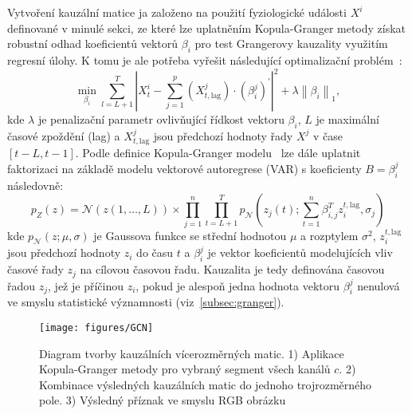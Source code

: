 Vytvoření kauzální matice ja založeno na použití fyziologické události $X^i$
definované v minulé sekci, ze které lze uplatněním Kopula-Granger metody získat
robustní odhad koeficientů vektorů $\beta_i$ pro test Grangerovy kauzality
využitím regresní úlohy. K tomu je ale potřeba vyřešit následující optimalizační
problém~\cite{Schindler2013,Guy2016}:
\begin{equation}
    \min _{\beta_i} \sum_{l=L+1}^T\left|X_t^i-\sum_{j=1}^p\left(X_{t, \text {lag}}^j\right) \cdot\left(\beta_i^j\right)^{\prime}\right|^2+\lambda\left\|\beta_i\right\|_1,
\end{equation}
kde $\lambda$ je penalizační parametr ovlivňující řídkost vektoru $\beta_i$, $L$
je maximální časové zpoždění (lag) a ${X}_{t, \text {lag}}^j$ jsou předchozí
hodnoty řady $X^j$ v čase $[t - L, t - 1]$. Podle definice Kopula-Granger
modelu~\cite{Schindler2013,Guy2016} lze dále uplatnit faktorizaci na základě
modelu vektorové autoregrese (\gls{VAR}) s koeficienty $B = {{\beta}_{i}^j}$
následovně:
\begin{equation}
    p_Z(z)=\mathcal{N}(z(1, \ldots, L)) \times \prod_{j=1}^n \prod_{t=L+1}^T p_{\mathcal{N}}\left(z_j(t) ; \sum_{t=1}^n \beta_{i, j}^T z_i^{t, \text {lag}}, \sigma_j\right)
\end{equation}
kde $p_{\mathcal{N}}(z ; \mu, \sigma)$ je Gaussova funkce se střední hodnotou
$\mu$ a rozptylem $\sigma^2$, $z_i^{t, \text {lag}}$ jsou předchozí hodnoty
$z_i$ do času $t$ a ${\beta}_{i}^j$ je vektor koeficientů modelujících vliv
časové řady $z_j$ na cílovou časovou řadu. Kauzalita je tedy definována časovou
řadou $z_j$, jež je příčinou $z_i$, pokud je alespoň jedna hodnota vektoru
${\beta}_{i}^j$ nenulová ve smyslu statistické významnosti
(viz~\ref{subsec:granger}).

\begin{figure}[!htb]
    \begin{center}
        \texttt{[image: figures/GCN]}
        \caption{Diagram tvorby kauzálních vícerozměrných matic. 1) Aplikace
            Kopula-Granger metody pro vybraný segment všech kanálů $c$. 2) Kombinace
            výsledných kauzálních matic do jednoho trojrozměrného pole. 3) Výsledný
            příznak ve smyslu RGB obrázku}
        \label{fig:GCN}
    \end{center}
\end{figure}

